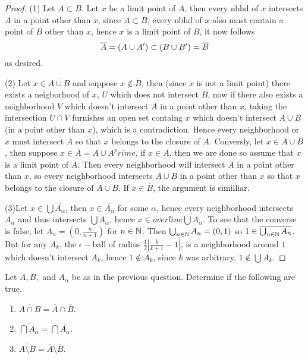     \begin{proof}
        (1) Let $A \subset B$. Let $x$ be a limit point of $A$, then every nbhd of $x$ intersects $A$ in a point other than $x$, since $A \subset B$, every nbhd of $x$ also must contain a point of $B$ other than $x$, 
        hence $x$ is a limit point of $B$, it now follows 
        \[\cA = (A \cup A^\prime) \subset (B \cup B^\prime ) = \cB\]
        as desired. 

        (2) Let $x \in \overline{A \cup B}$ and suppose $x \notin \overline{B}$, then (since $x$ is not a limit point) there exists a neigborhood of $x$, $U$ which does not intersect $B$, now if there also exists a neighborhood $V$ which doesn't intersect $A$ in a point 
        other than $x$, taking the intersection $U \cap V$ furnishes an open set containg $x$ which doesn't intersect $A \cup B$ (in a point other than $x$), which is a contradiction. Hence every neighborhood or $x$ must intersect $A$ so that $x$ belongs to the 
        closure of $A$. Conversly,  let $x \in \overline{A} \cup \overline{B}$, then suppose $x \in \overline{A} = A \cup A^prime$, if $x \in A$, then we are done so assume that $x$ is a limit point of $A$. Then every neighborhood will intersect $A$ in a point other than $x$, so 
        every neighborhood intersects $A \cup B$ in a point other than $x$ so that $x$ belongs to the closure of $A \cup B$. If $x \in \overline{B}$, the argument is similliar. 

        (3)Let $x \in \bigcup \overline{A_\alpha}$, then $x \in \overline{A_\alpha}$ for some $\alpha$, hence every neighborhood intersects $A_\alpha$ and thus intersects $\bigcup A_\alpha$, hence $x \in overline{\bigcup A_\alpha}$. 
        To see that the converse is false, let $A_n = (0, \frac{n}{n+1})$ for $n \in \mathbb{N}$. Then $\bigcup_{n \in \mathbb{N}}A_n = (0, 1)$ so $1 \in \overline{\bigcup_{n \in \mathbb{N}} A_n}$. But for any $A_k$, the $\epsilon-$ball of radius $\frac{1}{2} |\frac{k}{k+1} -1|$, 
        is a neighborhood around $1$ which doesn't intersect $A_k$, hence $1 \notin \overline{A_k}$, since $k$ was arbitrary, $1 \notin \bigcup \overline{A_k}$.  

    \end{proof}


    \question 
    Let $A, B, $ and $A_\alpha$ be as in the previous question. Determine if the following are true. 

    \begin{enumerate}
        \item $\overline{A \cap B} = \overline{A} \cap \overline{B}$. 
        \item $\overline{\bigcap A_\alpha} = \bigcap \overline{A_\alpha}$. 
        \item $\overline{A \setminus B} = \overline{A} \setminus \overline{B}$. 
        
    \end{enumerate}

